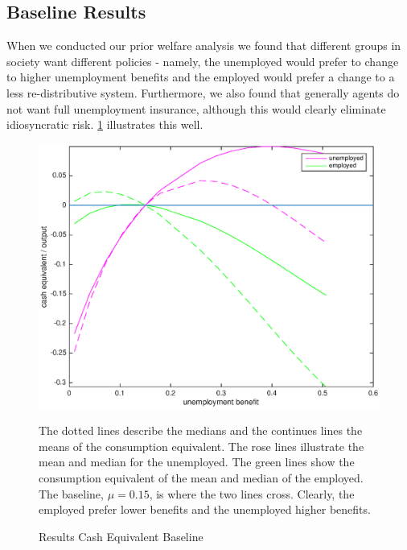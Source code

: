 \documentclass[a4paper,12pt]{article}
\begin{document}
\subsection{Baseline Results}

When we conducted our prior welfare analysis we found that different groups in society want different policies - namely, the unemployed would prefer to change to higher unemployment benefits and the employed would prefer a change to a less re-distributive system. Furthermore, we also found that generally agents do not want full unemployment insurance, although this would clearly eliminate idiosyncratic risk. 
\ref{baseline_ue_vs_e} illustrates this well. 

\begin{figure}
\caption{Results Cash Equivalent Baseline } 
\label{baseline_ue_vs_e}	%
\centering
\includegraphics[scale=.5]{Cash_equivalent_baseline}  %

\begin{minipage}{0.8\linewidth}
\footnotesize{The dotted lines describe the medians and the continues lines the means of the consumption equivalent. The rose lines illustrate the mean and median for the unemployed. The green lines show the consumption equivalent of the mean and median of the employed. The baseline, $\mu = 0.15$, is where the two lines cross. Clearly, the employed prefer lower benefits and the unemployed higher benefits. }
\end{minipage}

\end{figure}
\end{document}
